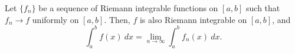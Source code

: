 \documentclass[11pt]{article}
\theoremstyle{definition}
\theoremstyle{remark}
\numberwithin{equation}{module}
\begin{document}
    \begin{theorem}
        Let $\{f_n\}$ be a sequence of Riemann integrable
        functions on $[a, b]$ such that $f_n \to f$ uniformly on $[a, b]$. Then, $f$
        is also Riemann integrable on $[a, b]$, and \[
            \int_a^b f(x)\:dx = \lim_{n \to \infty} \int_a^b f_n(x)\:dx.
        \] 
    \end{theorem}
\end{document}
